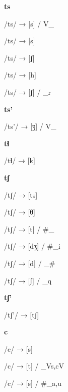\begin{center}\textbf{ts}\end{center}
\begin{multicols}{4}
\noindent /ts/ → [s] / V\_

\noindent /ts/ → [s]

\noindent /ts/ → [ʃ]

\noindent /ts/ → [h]

\noindent /ts/ → [ʃ] / \_r

\end{multicols}

\begin{center}\textbf{ts'}\end{center}
\begin{multicols}{4}
\noindent /ts'/ → [ʒ] / V\_

\end{multicols}

\begin{center}\textbf{tɬ}\end{center}
\begin{multicols}{4}
\noindent /tɬ/ → [k]

\end{multicols}

\begin{center}\textbf{tʃ}\end{center}
\begin{multicols}{4}
\noindent /tʃ/ → [ts]

\noindent /tʃ/ → [θ]

\noindent /tʃ/ → [t] / \#\_

\noindent /tʃ/ → [dʒ] / \#\_i

\noindent /tʃ/ → [d] / \_\#

\noindent /tʃ/ → [ʃ] / \_q

\end{multicols}

\begin{center}\textbf{tʃ'}\end{center}
\begin{multicols}{4}
\noindent /tʃ'/ → [tʃ]

\end{multicols}

\begin{center}\textbf{c}\end{center}
\begin{multicols}{4}
\noindent /c/ → [s]

\noindent /c/ → [t] / \_V{s,c}V

\noindent /c/ → [s] / \#\_{a,u}

\end{multicols}

